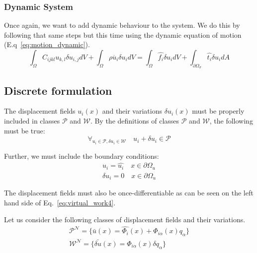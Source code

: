 \documentclass[en]{minipw} %
\begin{document}
\subsubsection{Dynamic System}
Once again, we want to add dynamic behaviour to the system. We do this by following that same steps but this time using the dynamic equation of motion (E.q~\ref{eq:motion_dynamic}).
\begin{equation}
\label{eq:virtual_work_dynamic4}
\int_{\Omega}C_{ijkl} u_{k,l} \delta u_{i,j} dV + \int_{\Omega}\rho \ddot{u_i} \delta u_i dV = \int_{\Omega} \hat{f_i} \delta u_{i} dV + \int_{\partial \Omega_{\sigma}} \hat{t_i} \delta u_{i} dA
\end{equation}

\subsection{Discrete formulation}

The displacement fields $u_{i}(x)$ and their variations $\delta u_{i}(x)$ must be properly included in classes $\mathcal{P}$ and $\mathcal{W}$. By the definitions of classes $\mathcal{P}$ and $\mathcal{W}$, the following must be true:
\begin{equation}
\forall_{u_{i} \in \mathcal{P}, \delta u_{i} \in \mathcal{W}} \quad u_i + \delta u_i \in \mathcal{P}
\end{equation}

Further, we must include the boundary conditions:
\begin{equation}
\begin{aligned}
u_i = \hat{u_i} \quad x \in \partial  \Omega_{u}
\\
\delta u_i = 0 \quad x \in \partial  \Omega_{u}
\end{aligned}
\end{equation}

The displacement fields must also be once-differentiable as can be seen on the left hand side of Eq.~\ref{eq:virtual_work4}.

Let us consider the following classes of displacement fields and their variations.
\begin{equation}
\begin{aligned}
\mathcal{P^{N}} = \{\bar{u}(x) = \hat{\Phi_i}(x) + \Phi_{i \alpha}(x)q_{\alpha} \}
\\
\mathcal{W^{N}} = \{\bar{\delta u}(x) = \Phi_{i \alpha}(x) \delta q_{\alpha} \}
\end{aligned}
\end{equation}
\end{document}
